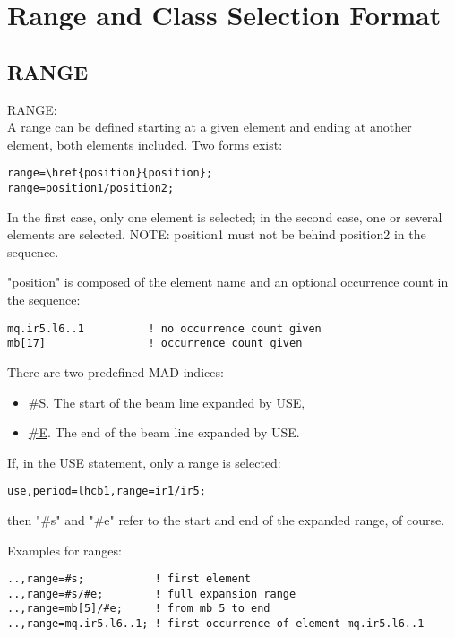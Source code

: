 
\chapter{Range and Class Selection Format}

\section{RANGE}

 \href{range}{RANGE}: \\
A range can be defined starting at  a given element and ending at
another element, both elements included. Two forms exist:  

\begin{verbatim}
range=\href{position}{position};
range=position1/position2;
\end{verbatim} 

In the first case, only one element is selected; in the second case, one
or several elements are selected. NOTE: position1 must not be behind
position2 in the sequence.  

"position" is composed of the element name and an optional occurrence count in the sequence: 
\begin{verbatim}
mq.ir5.l6..1          ! no occurrence count given
mb[17]                ! occurrence count given
\end{verbatim} 

There are two predefined MAD indices: 
\begin{itemize}
   \item \href{s}{\#S}. The start of the beam line expanded by USE, 
   \item \href{e}{\#E}. The end of the beam line expanded by USE. 
\end{itemize} 

If, in the USE statement, only a range is selected: 
\begin{verbatim}
use,period=lhcb1,range=ir1/ir5;
\end{verbatim} 
then "\#s" and "\#e" refer to the start and end of the expanded range, of course. 

 Examples for ranges: 
\begin{verbatim}
..,range=#s;           ! first element
..,range=#s/#e;        ! full expansion range
..,range=mb[5]/#e;     ! from mb 5 to end
..,range=mq.ir5.l6..1; ! first occurrence of element mq.ir5.l6..1
\end{verbatim}

